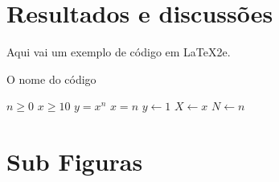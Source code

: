 \section{Resultados e discussões}

\par Aqui vai um exemplo de código em \LaTeX2e.

\begin{algorithm} [H]
	\caption{O nome do código}\label{alg:cap}

	\begin{algorithmic} [H]
		\Require $n \geq 0$	
    \Require $x \geq 10$	
		\Ensure $y = x^n$   	
    \Ensure $x = n $      
		\State $y \gets 1$
		\State $X \gets x$
		\State $N \gets n$
	\end{algorithmic}

\end{algorithm}

\section{Sub Figuras}

